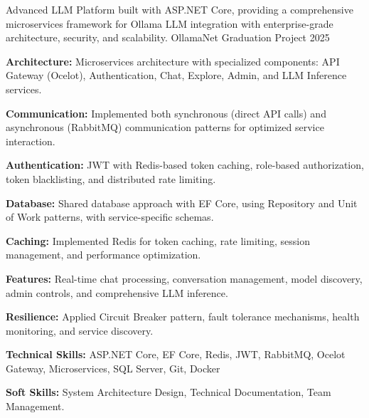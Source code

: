 

\begin{cventries}
\cventry
    {Advanced LLM Platform built with ASP.NET Core, providing a comprehensive microservices framework for Ollama LLM integration with enterprise-grade architecture, security, and scalability.
    } %
    {OllamaNet} %
    {Graduation Project} %
    {2025} %
    {
      \begin{cvitems} %
        \item \textbf{Architecture:}{ Microservices architecture with specialized components: API Gateway (Ocelot), Authentication, Chat, Explore, Admin, and LLM Inference services.}
        \item \textbf{Communication:}{ Implemented both synchronous (direct API calls) and asynchronous (RabbitMQ) communication patterns for optimized service interaction.}
        \item \textbf{Authentication:}{ JWT with Redis-based token caching, role-based authorization, token blacklisting, and distributed rate limiting.}
        \item \textbf{Database:}{ Shared database approach with EF Core, using Repository and Unit of Work patterns, with service-specific schemas.}
        \item \textbf{Caching:}{ Implemented Redis for token caching, rate limiting, session management, and performance optimization.}
        \item \textbf{Features:}{ Real-time chat processing, conversation management, model discovery, admin controls, and comprehensive LLM inference.}
        \item \textbf{Resilience:}{ Applied Circuit Breaker pattern, fault tolerance mechanisms, health monitoring, and service discovery.}
        \item \textbf{Technical Skills:}{ ASP.NET Core, EF Core, Redis, JWT, RabbitMQ, Ocelot Gateway, Microservices, SQL Server, Git, Docker}
        \item \textbf{Soft Skills:}{ System Architecture Design, Technical Documentation, Team Management.}
      \end{cvitems}
    }


\end{cventries}
